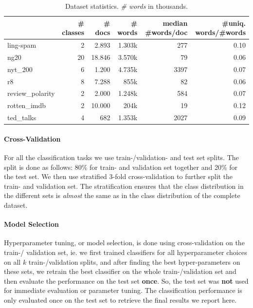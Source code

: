 \begin{table}[htb!]
\centering
\begin{tabular}{lrrrrr}
{} &  \# classes &  \# docs & \# words & median \#words/doc &  \#uniq. words/\#words \\
\midrule
ling-spam       & 2 &  2.893 &  1.303k & 277 & 0.10 \\
ng20            & 20 &  18.846 &  3.570k & 79 & 0.06 \\
nyt\_200         & 6 &  1.200 &  4.735k & 3397 & 0.07 \\
r8              & 8 &  7.288 &  855k & 82 & 0.06 \\
review\_polarity & 2 &  2.000 &  1.248k & 584 & 0.07 \\
rotten\_imdb     & 2 &  10.000 &  204k & 19 & 0.12 \\
ted\_talks       & 4 &  682 &  1.353k & 2027 & 0.09 \\
\bottomrule
\end{tabular}
\caption[Statistics: Datasets]{Dataset statistics. \textit{\# words} in thousands.}\label{table:dataset_statistics}
\end{table}



\paragraph{Cross-Validation}
For all the classification tasks we use train-/validation- and test set splits.
The split is done as follows: 80\% for train- and validation set together and 20\% for the test set.
We then use stratified 3-fold cross-validation to further split the train- and validation set.
The stratification ensures that the class distribution in the different sets is \textit{almost} the same as in the class distribution of the complete dataset.

\paragraph{Model Selection}
Hyperparameter tuning, or model selection, is done using cross-validation on the train-/ validation set, ie. we first trained classifiers for all hyperparameter choices on all $k$ train-/validation splits, and after finding the best hyper-parameters on these sets, we retrain the best classifier on the whole train-/validation set and then evaluate the performance on the test set \textbf{once}.
So, the test set was \textbf{not} used for immediate evaluation or parameter tuning.
The classification performance is only evaluated once on the test set to retrieve the final results we report here.

